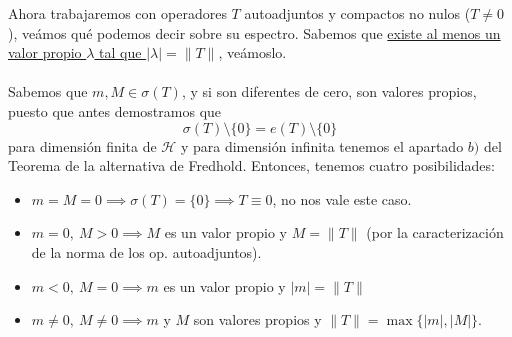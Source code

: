 \noindent
Ahora trabajaremos con operadores $T$ autoadjuntos y compactos no nulos ($T \neq 0$), veámos qué podemos decir sobre su espectro. Sabemos que \underline{existe al menos un valor propio $\lambda$ tal que $|\lambda|=\|T\|$}, veámoslo. \\ \\
\noindent
Sabemos que $m,M\in \sigma(T)$, y si son diferentes de cero, son valores propios, puesto que antes demostramos que 
$$\sigma(T)\setminus\{0\}=e(T)\setminus\{0\}$$
para dimensión finita de $\mathcal{H}$ y para dimensión infinita tenemos el apartado $b)$ del Teorema de la alternativa de Fredhold. Entonces, tenemos cuatro posibilidades:
\begin{itemize}
    \item $m = M = 0 \implies \sigma(T) = \{0\} \implies T \equiv 0$, no nos vale este caso.
    \item $m = 0, \ M > 0 \implies M$ es un valor propio y $M = \|T\|$ (por la caracterización de la norma de los op. autoadjuntos).
    \item $m < 0, \ M = 0 \implies m$ es un valor propio y $|m| = \|T\|$
    \item $m \neq 0, \ M \neq 0 \implies m$ y $M$ son valores propios y $\|T\| = \max\{|m|, |M|\}$.
\end{itemize}

